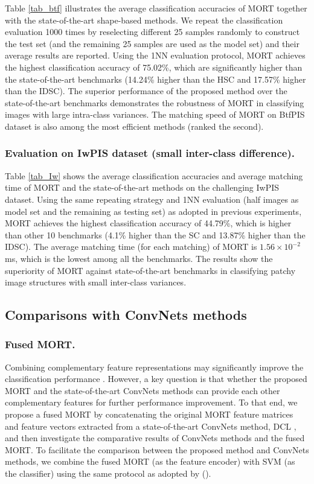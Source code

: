 \documentclass[letterpaper]{article} %
\begin{document}
Table \ref{tab_btf} illustrates the average classification accuracies of MORT together with the state-of-the-art shape-based methods. We repeat the classification evaluation 1000 times by reselecting different 25 samples randomly to construct the test set (and the remaining 25 samples are used as the model set) and their average results are reported. Using the 1NN evaluation protocol, MORT achieves the highest classification accuracy of 75.02\%, which are significantly higher than the state-of-the-art benchmarks (14.24\% higher than the HSC and 17.57\% higher than the IDSC). The superior performance of the proposed method over the state-of-the-art benchmarks demonstrates the robustness of MORT in classifying images with large intra-class variances. The matching speed of MORT on BtfPIS dataset is also among the most efficient methods (ranked the second). 


\subsubsection{Evaluation on IwPIS dataset (small inter-class difference).}

Table \ref{tab_Iw} shows the average classification accuracies and average matching time of MORT and the state-of-the-art methods on the challenging IwPIS dataset. Using the same repeating strategy and 1NN evaluation (half images as model set and the remaining as testing set) as adopted in previous experiments, MORT achieves the highest classification accuracy of 44.79\%, which is higher than other 10 benchmarks (4.1\% higher than the SC and 13.87\% higher than the IDSC). The average matching time (for each matching) of MORT is $ 1.56 \times 10^{-2}$ ms, which is the lowest among all the benchmarks. The results show the superiority of MORT against state-of-the-art benchmarks in classifying patchy image structures with small inter-class variances.




\subsection{Comparisons with ConvNets methods}
\subsubsection{Fused MORT.}
Combining complementary feature representations may significantly improve the classification performance \cite{wang2015beyond}. However, a key question is that whether the proposed MORT and the state-of-the-art ConvNets methods can provide each other complementary features for further performance improvement. To that end, we propose a fused MORT by concatenating the original MORT feature matrices and feature vectors extracted from a state-of-the-art ConvNets method, DCL \cite{chen2019destruction}, and then investigate the comparative results of ConvNets methods and the fused MORT. To facilitate the comparison between the proposed method and ConvNets methods, we combine the fused MORT (as the feature encoder) with SVM (as the classifier) using the same protocol as adopted by \citeauthor{wu2019ip102} (\citeyear{wu2019ip102}). 
\end{document}
